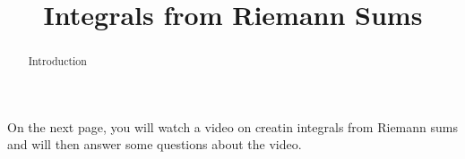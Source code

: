 \documentclass[handout]{ximera}
\title{Integrals from Riemann Sums}
\begin{document}
\begin{abstract} Introduction %
\end{abstract}

\maketitle

On the next page, you will watch a video on creatin integrals from Riemann sums and will then answer some questions about the video.
\end{document}
